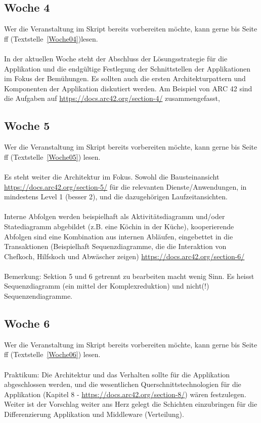 \subsection{Woche 4}
Wer die Veranstaltung im Skript bereits vorbereiten möchte, kann gerne bis Seite \pageref{Woche04}ff (Textstelle~\ref{Woche04})lesen.
\\\\
In der aktuellen Woche steht der Abschluss der Lösungsstrategie  für die Applikation und die endgültige Festlegung der Schnittstellen der Applikationen im Fokus der Bemühungen. Es sollten auch die ersten Architekturpattern und Komponenten der Applikation diskutiert werden. Am Beispiel von ARC 42 sind die Aufgaben auf \url{https://docs.arc42.org/section-4/} zusammengefasst,

\subsection{Woche 5}
Wer die Veranstaltung im Skript bereits vorbereiten möchte, kann gerne bis Seite  \pageref{Woche05}ff (Textstelle~\ref{Woche05}) lesen.
\\\\
Es steht weiter die Architektur im Fokus. Sowohl die Bausteinansicht \url{https://docs.arc42.org/section-5/} für die relevanten Dienste/Anwendungen, in mindestens Level 1 (besser 2), und die dazugehörigen Laufzeitansichten.
\\\\
Interne Abfolgen werden beispielhaft als Aktivitätsdiagramm und/oder Statediagramm abgebildet (z.B. eine Köchin in der Küche), kooperierende Abfolgen sind eine Kombination aus internen Abläufen, eingebettet in die Transaktionen (Beispielhaft Sequenzdiagramme, die die Interaktion von Chefkoch, Hilfskoch und Abwäscher zeigen) \url{https://docs.arc42.org/section-6/}
\\\\
Bemerkung: Sektion 5 und 6 getrennt zu bearbeiten macht wenig Sinn. Es heisst Sequenzdiagramm (ein mittel der Komplexreduktion) und nicht(!) Sequenzendiagramme.
\subsection{Woche 6}
Wer die Veranstaltung  im Skript bereits vorbereiten möchte, kann gerne bis Seite \pageref{Woche06}ff (Textstelle~\ref{Woche06}) lesen.
\\\\
Praktikum: Die Architektur und das Verhalten sollte für die Applikation abgeschlossen werden, und die wesentlichen Querschnittstechnologien für die Applikation (Kapitel 8 - \url{https://docs.arc42.org/section-8/}) wären festzulegen. Weiter ist der Vorschlag weiter ans Herz gelegt die Schichten einzubringen für die Differenzierung Applikation und Middleware (Verteilung).
